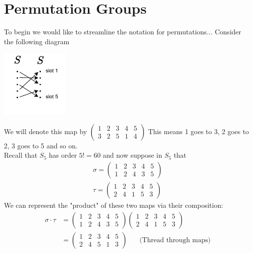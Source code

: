 \section{Permutation Groups}
To begin we would like to streamline the notation for permutations... Consider the following diagram\\
\begin{center}
\includegraphics[width=0.25\textwidth]{Figures/Permutation_Notation_ex.pdf}
\end{center}
We will denote this map by $\begin{pmatrix} 1&2&3&4&5\\ 3&2&5&1&4
\end{pmatrix}$ This means 1 goes to 3, 2 goes to 2, 3 goes to 5 and so on.\\
Recall that $S_5$ has order $5!=60$ and now suppose in $S_5$ that 
\begin{align}
    \sigma = \begin{pmatrix}
    1&2&3&4&5\\1&2&4&3&5
    \end{pmatrix} \nonumber \\
    \tau = \begin{pmatrix}
    1&2&3&4&5 \\ 2&4&1&5&3
    \end{pmatrix} \nonumber
\end{align}
We can represent the "product" of these two maps via their composition:
\begin{align}
    \sigma \cdot \tau &= \begin{pmatrix}
    1&2&3&4&5 \\ 1&2&4&3&5
    \end{pmatrix}\begin{pmatrix}
    1&2&3&4&5 \\ 2&4&1&5&3
    \end{pmatrix}\nonumber \\
    &= \begin{pmatrix}
    1&2&3&4&5 \\
    2&4&5&1&3
    \end{pmatrix} \ \ \ \ \ \ \ \ \text{(Thread through maps)} \nonumber
\end{align}


